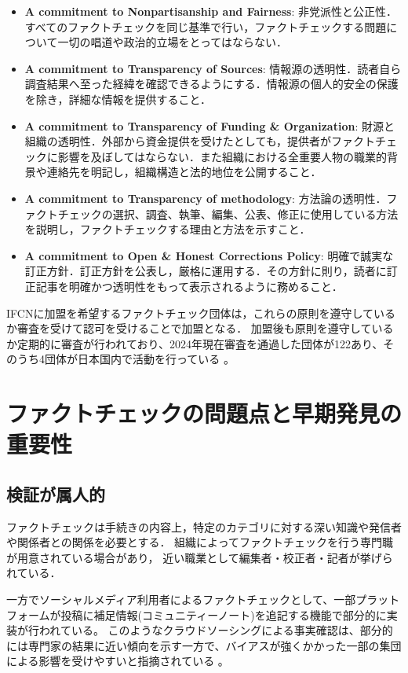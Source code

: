 \begin{itemize}
    \item \textbf{A commitment to Nonpartisanship and Fairness}: 非党派性と公正性．すべてのファクトチェックを同じ基準で行い，ファクトチェックする問題について一切の唱道や政治的立場をとってはならない．
    \item \textbf{A commitment to Transparency of Sources}: 情報源の透明性．読者自ら調査結果へ至った経緯を確認できるようにする．情報源の個人的安全の保護を除き，詳細な情報を提供すること．
    \item \textbf{A commitment to Transparency of Funding \& Organization}: 財源と組織の透明性．外部から資金提供を受けたとしても，提供者がファクトチェックに影響を及ぼしてはならない．また組織における全重要人物の職業的背景や連絡先を明記し，組織構造と法的地位を公開すること．
    \item \textbf{A commitment to Transparency of methodology}: 方法論の透明性．ファクトチェックの選択、調査、執筆、編集、公表、修正に使用している方法を説明し，ファクトチェックする理由と方法を示すこと．
    \item \textbf{A commitment to Open \& Honest Corrections Policy}: 明確で誠実な訂正方針．訂正方針を公表し，厳格に運用する．その方針に則り，読者に訂正記事を明確かつ透明性をもって表示されるように務めること．
\end{itemize}

IFCNに加盟を希望するファクトチェック団体は，これらの原則を遵守しているか審査を受けて認可を受けることで加盟となる．
加盟後も原則を遵守しているか定期的に審査が行われており、2024年現在審査を通過した団体が122あり、そのうち4団体が日本国内で活動を行っている \cite{IFCNCoP}。



\section{ファクトチェックの問題点と早期発見の重要性}
\subsection{検証が属人的}
ファクトチェックは手続きの内容上，特定のカテゴリに対する深い知識や発信者や関係者との関係を必要とする．
組織によってファクトチェックを行う専門職が用意されている場合があり，
近い職業として編集者・校正者・記者が挙げられている\cite{deahl_2019}．

一方でソーシャルメディア利用者によるファクトチェックとして、一部プラットフォームが投稿に補足情報(コミュニティーノート)を追記する機能で部分的に実装が行われている。
このようなクラウドソーシングによる事実確認は、部分的には専門家の結果に近い傾向を示す一方で、バイアスが強くかかった一部の集団による影響を受けやすいと指摘されている \cite{10.1145/3511808.3557279}。


